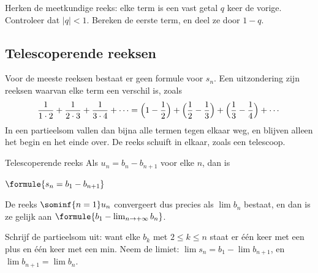 \begin{werkwijze}
Herken de meetkundige reeks: elke term is een vast getal $q$ keer de vorige. Controleer dat $|q| < 1$. Bereken de eerste term, en deel ze door $1 - q$.
\end{werkwijze}


\begin{oefeningen}

\end{oefeningen}

\subsection{Telescoperende reeksen}

Voor de meeste reeksen bestaat er geen formule voor $s_n$. Een uitzondering zijn reeksen waarvan elke term een verschil is, zoals
\[ \frac{1}{1 \cdot 2} + \frac{1}{2 \cdot 3} + \frac{1}{3 \cdot 4} + \cdots = \Bigl(1 - \frac12\Bigr) + \Bigl(\frac12 - \frac13\Bigr) + \Bigl(\frac13 - \frac14\Bigr) + \cdots \]
In een partieelsom vallen dan bijna alle termen tegen elkaar weg, en blijven alleen het begin en het einde over. De reeks schuift in elkaar, zoals een telescoop.

\begin{theorie}
\begin{stelling}{Telescoperende reeks}
Als $u_n = b_n - b_{n+1}$ voor elke $n$, dan is

\vspace{1mm}
\qquad $\formule{s_n = b_1 - b_{n+1}}$

\vspace{1mm}
De reeks $\sominf{n=1} u_n$ convergeert dus precies als $\lim b_n$ bestaat, en dan is ze gelijk aan $\formule{b_1 - \lim_{n\to+\infty} b_n}$.
\end{stelling}

\begin{bewijs}
Schrijf de partieelsom uit:
want elke $b_k$ met $2 \leqslant k \leqslant n$ staat er één keer met een plus en één keer met een min. Neem de limiet: $\lim s_n = b_1 - \lim b_{n+1}$, en $\lim b_{n+1} = \lim b_n$.
\end{bewijs}
\end{theorie}

